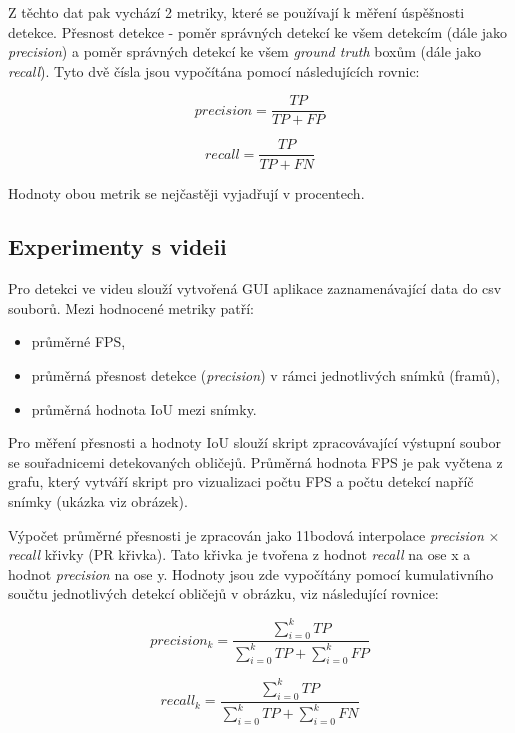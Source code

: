 Z těchto dat pak vychází 2 metriky, které se používají k měření úspěšnosti detekce. Přesnost detekce - poměr správných detekcí ke všem detekcím (dále jako \emph{precision}) a poměr správných detekcí ke všem \emph{ground truth} boxům (dále jako \emph{recall}). Tyto dvě čísla jsou vypočítána pomocí následujících rovnic:

\begin{equation}
  precision = \frac{TP}{TP + FP}
\end{equation}

\begin{equation}
  recall = \frac{TP}{TP + FN}
\end{equation}

\noindent Hodnoty obou metrik se nejčastěji vyjadřují v procentech.


\subsection*{Experimenty s videii}
Pro detekci ve videu slouží vytvořená GUI aplikace zaznamenávající data do csv souborů. Mezi hodnocené metriky patří:

\begin{itemize}
  \item průměrné FPS,
  \item průměrná přesnost detekce (\emph{precision}) v rámci jednotlivých snímků (framů),
  \item průměrná hodnota IoU mezi snímky.
\end{itemize}

Pro měření přesnosti a hodnoty IoU slouží skript zpracovávající výstupní soubor se souřadnicemi detekovaných obličejů. Průměrná hodnota FPS je pak vyčtena z grafu, který vytváří skript pro vizualizaci počtu FPS a počtu detekcí napříč snímky (ukázka viz obrázek). %

Výpočet průměrné přesnosti je zpracován jako 11bodová interpolace \cite{interpolace} \emph{precision} $\times$ \emph{recall} křivky (PR křivka). Tato křivka je tvořena z hodnot \emph{recall} na ose x a hodnot \emph{precision} na ose y. Hodnoty jsou zde vypočítány pomocí kumulativního součtu jednotlivých detekcí obličejů v obrázku, viz následující rovnice:

\begin{equation}
  precision_k = \frac{\sum_{i=0}^{k} TP}{\sum_{i=0}^{k} TP + \sum_{i=0}^{k} FP}
\end{equation}

\begin{equation}
  recall_k = \frac{\sum_{i=0}^{k} TP}{\sum_{i=0}^{k} TP + \sum_{i=0}^{k} FN}
\end{equation}

